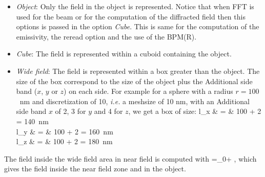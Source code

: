 \begin{itemize}

\item {\it Object}: Only the field in the object is
  represented. Notice that when FFT is used for the beam or for the
  computation of the diffracted field then this options is passed in
  the option {\it Cube}. This is same for the computation of the
  emissivity, the reread option and the use of the BPM(R).

\item {\it Cube}: The field is represented within a cuboid containing
  the object.

\item {\it Wide field}: The field is represented within a box greater
  than the object.  The size of the box correspond to the size of the
  object plus the Additional side band ($x$, $y$ or $z$) on each
  side. For example for a sphere with a radius $r=100$~nm and
  discretization of 10, {\it i.e.} a meshsize of 10 nm, with an
  Additional side band $x$ of 2, 3 for $y$ and 4 for $z$, we get a box
  of size:
  \be l_x & = & 100 + 2  = 140~{\rm nm} \\
  l_y & = & 100 + 2  = 160~{\rm nm} \\
  l_z & = & 100 + 2  = 180~{\rm nm}
  \ee
\end{itemize}
The field inside the wide field area in near field is computed with
  \be {}=_0+  , \ee
which gives the field inside the near field zone and in the object.







